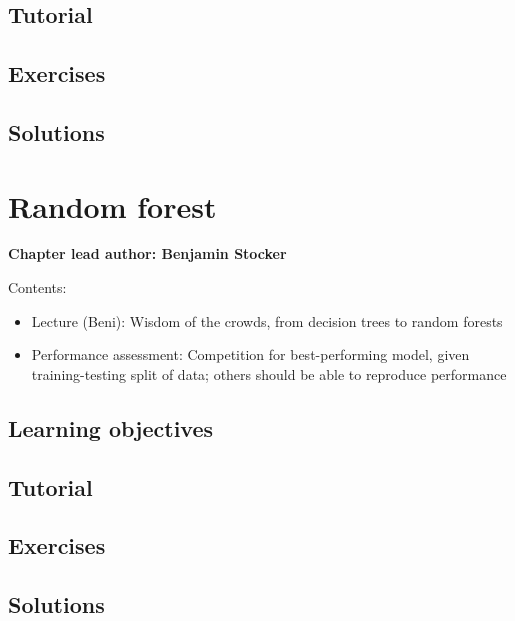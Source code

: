 \documentclass[
]{book}
\providecommand{\tightlist}{%
  \setlength{\itemsep}{0pt}\setlength{\parskip}{0pt}}
\begin{document}
\hypertarget{tutorial-8}{%
\section{Tutorial}\label{tutorial-8}}

\hypertarget{exercises-8}{%
\section{Exercises}\label{exercises-8}}

\hypertarget{solutions-8}{%
\section{Solutions}\label{solutions-8}}

\hypertarget{random_forest}{%
\chapter{Random forest}\label{random_forest}}

\textbf{Chapter lead author: Benjamin Stocker}

Contents:

\begin{itemize}
\tightlist
\item
  Lecture (Beni): Wisdom of the crowds, from decision trees to random forests
\item
  Performance assessment: Competition for best-performing model, given training-testing split of data; others should be able to reproduce performance
\end{itemize}

\hypertarget{learning-objectives-9}{%
\section{Learning objectives}\label{learning-objectives-9}}

\hypertarget{tutorial-9}{%
\section{Tutorial}\label{tutorial-9}}

\hypertarget{exercises-9}{%
\section{Exercises}\label{exercises-9}}

\hypertarget{solutions-9}{%
\section{Solutions}\label{solutions-9}}
\end{document}
